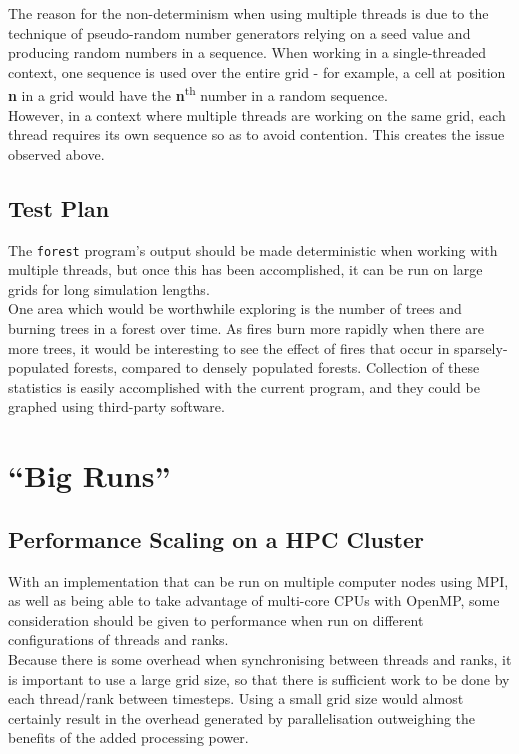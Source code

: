\documentclass[11pt,a4paper]{report}
\begin{document}
The reason for the non-determinism when using multiple threads is due to the
technique of pseudo-random number generators relying on a seed value and
producing random numbers in a sequence. When working in a single-threaded
context, one sequence is used over the entire grid - for example, a cell 
at position \textbf{n} in a grid would have the \textbf{n}\textsuperscript{th} 
number in a random sequence.\\

However, in a context where multiple threads are working on the same grid,
each thread requires its own sequence so as to avoid contention. This creates
the issue observed above. 

\newpage
\section{Test Plan}

The \texttt{forest} program's output should be made deterministic when working
with multiple threads, but once this has been accomplished, it can be run on
large grids for long simulation lengths.\\

One area which would be worthwhile exploring is the number of trees and burning
trees in a forest over time. As fires burn more rapidly when there are more
trees, it would be interesting to see the effect of fires that occur in
sparsely-populated forests, compared to densely populated forests. Collection
of these statistics is easily accomplished with the current program, and they
could be graphed using third-party software.

\newpage

\chapter{``Big Runs''}

\section{Performance Scaling on a HPC Cluster}

With an implementation that can be run on multiple computer nodes using MPI, as well as
being able to take advantage of multi-core CPUs with OpenMP, some consideration should be
given to performance when run on different configurations of threads and
ranks.\\

Because there is some overhead when synchronising between threads and ranks, it
is important to use a large grid size, so that there is sufficient work to be
done by each thread/rank between timesteps. Using a small grid size would
almost certainly result in the overhead generated by parallelisation
outweighing the benefits of the added processing power.\\
\end{document}
